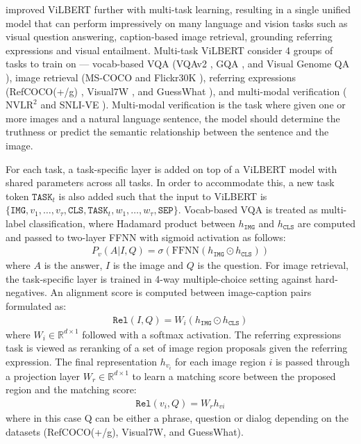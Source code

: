 \documentclass{article}
\begin{document}
\citet{lu2020multitask} improved ViLBERT further with multi-task learning, resulting in a single unified model that can perform impressively on many language and vision tasks such as visual question answering, caption-based image retrieval, grounding referring expressions and visual entailment. Multi-task ViLBERT consider 4 groups of tasks to train on --- vocab-based VQA (VQAv2 \citep{goyal2017vqa2}, GQA \citep{hudson2019gqa}, and Visual Genome QA \citep{krishnavisualgenome}), image retrieval (MS-COCO \citep{coco} and Flickr30K \citep{plummer2015vdg}), referring expressions (RefCOCO(+/g) \citep{kazemzadeh-etal-2014-referitgame, maorefcoco}, Visual7W \citep{zhu2016cvpr}, and GuessWhat \citep{guesswhat_game}), and multi-modal verification ($\text{NVLR}^2$ \citep{suhr-etal-2019-corpus} and  SNLI-VE \citep{xie2018visual}). Multi-modal verification is the task where given one or more images and a natural language sentence, the model should determine the truthness or predict the semantic relationship between the sentence and the image. 

For each task, a task-specific layer is added on top of a ViLBERT model with shared parameters across all tasks. In order to accommodate this, a new task token $\mathtt{TASK}_{t}$ is also added such that the input to ViLBERT is $\{\mathtt{IMG}, v_{1}, \dots, v_{\tau}, \mathtt{CLS}, \mathtt{TASK}_{t}, w_{1}, \dots, w_{\tau}, \mathtt{SEP}\}$. Vocab-based VQA is treated as multi-label classification, where Hadamard product between $h_{\mathtt{IMG}}$ and $h_{\mathtt{CLS}}$ are computed and passed to two-layer FFNN with sigmoid activation as follows:
\begin{align}
    P_{v}(A|I, Q) = \sigma(\text{FFNN}(h_{\mathtt{IMG}} \odot h_{\mathtt{CLS}}))
\end{align}
where $A$ is the answer, $I$ is the image and $Q$ is the question. For image retrieval, the task-specific layer is trained in 4-way multiple-choice setting against hard-negatives. An alignment score is computed between image-caption pairs formulated as:
\begin{align}
    \mathtt{Rel}(I,Q) = W_{i}(h_{\mathtt{IMG}} \odot h_{\mathtt{CLS}})
\end{align}
where $W_{i} \in \mathbb{R}^{d \times 1}$ followed with a softmax activation. The referring expressions task is viewed as reranking of a set of image region proposals given the referring expression. The final representation $h_{v_{i}}$ for each image region $i$ is passed through a projection layer $W_{r} \in \mathbb{R}^{d \times 1}$ to learn a matching score between the proposed region and the matching score: 
\begin{align}
    \mathtt{Rel}(v_{i}, Q) = W_{r}h_{vi}
\end{align}
where in this case Q can be either a phrase, question or dialog depending on the datasets (RefCOCO(+/g), Visual7W, and GuessWhat). 
\end{document}
